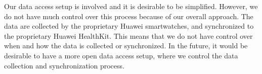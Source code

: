 Our data access setup is involved and it is desirable to be simplified.
However, we do not have much control over this process because of
our overall approach.
The data are collected by the proprietary Huawei smartwatches,
and synchronized to the proprietary Huawei HealthKit.
This means that we do not have control over when and how the data is
collected or synchronized.
In the future, it would be desirable to have a more open data access setup,
where we control the data collection and synchronization process.
